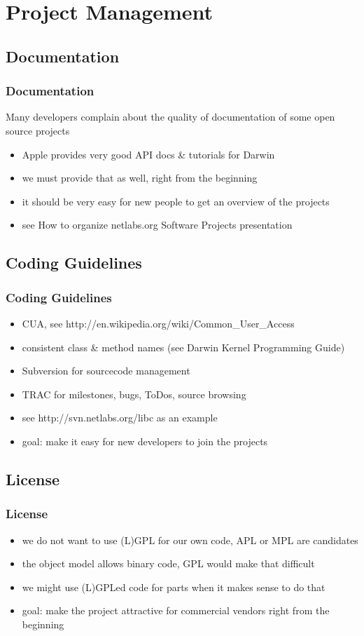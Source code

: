 \documentclass{beamer}
\begin{document}
\section{Project Management}
\subsection{Documentation}
\begin{frame}
\frametitle{Documentation}
Many developers complain about the quality of documentation of some open source projects
\begin{itemize}
  \item Apple provides very good API docs \& tutorials for Darwin
  \item we must provide that as well, right from the beginning
  \item it should be very easy for new people to get an overview of the projects
  \item see How to organize netlabs.org Software Projects presentation
\end{itemize}
\end{frame}

\subsection{Coding Guidelines}
\begin{frame}
\frametitle{Coding Guidelines}
\begin{itemize}
  \item CUA, see http://en.wikipedia.org/wiki/Common\_User\_Access
  \item consistent class \& method names (see Darwin Kernel Programming Guide)
  \item Subversion for sourcecode management
  \item TRAC for milestones, bugs, ToDos, source browsing
  \item see http://svn.netlabs.org/libc as an example
  \item goal: make it easy for new developers to join the projects
\end{itemize}
\end{frame}

\subsection{License}
\begin{frame}
\frametitle{License}
\begin{itemize}
  \item we do not want to use (L)GPL for our own code, APL or MPL are candidates
  \item the object model allows binary code, GPL would make that difficult
  \item we might use (L)GPLed code for parts when it makes sense to do that
  \item goal: make the project attractive for commercial vendors right from the beginning
\end{itemize}
\end{frame}
\end{document}
